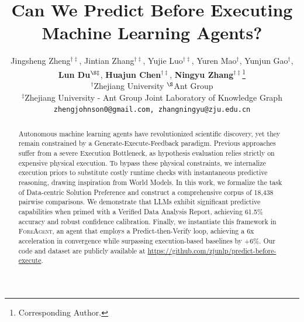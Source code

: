 \documentclass[11pt]{article}
\author{
    Jingsheng Zheng$^{\dag\ddag}$, Jintian Zhang$^{\dag\ddag}$, Yujie Luo$^{\dag\ddag}$, Yuren Mao$^{\dag}$, Yunjun Gao$^{\dag}$, \\
    \textbf{Lun Du}$^{\S\ddag}$, \textbf{Huajun Chen}$^{\dag\ddag}$, \textbf{Ningyu Zhang}$^{\dag\ddag}$\thanks{Corresponding Author.} \\
    $^{\dag}$Zhejiang University \quad $^{\S}$Ant Group \\
    $^{\ddag}$Zhejiang University - Ant Group Joint Laboratory of Knowledge Graph \\
    \texttt{zhengjohnson0@gmail.com, zhangningyu@zju.edu.cn}
}
\title{Can We Predict Before Executing Machine Learning Agents?}
\newcommand{\ours}{\textsc{ForeAgent}\xspace}
\begin{document}
\maketitle

\begin{abstract}
    Autonomous machine learning agents have revolutionized scientific discovery, yet they remain constrained by a Generate-Execute-Feedback paradigm. Previous approaches suffer from a severe Execution Bottleneck, as hypothesis evaluation relies strictly on expensive physical execution. To bypass these physical constraints, we internalize execution priors to substitute costly runtime checks with instantaneous predictive reasoning, drawing inspiration from World Models. In this work, we formalize the task of Data-centric Solution Preference and construct a comprehensive corpus of 18,438 pairwise comparisons. We demonstrate that LLMs exhibit significant predictive capabilities when primed with a Verified Data Analysis Report, achieving 61.5\% accuracy and robust confidence calibration. Finally, we instantiate this framework in \ours, an agent that employs a Predict-then-Verify loop, achieving a 6x acceleration in convergence while surpassing execution-based baselines by +6\%. Our code and dataset are publicly available at \url{https://github.com/zjunlp/predict-before-execute}.
\end{abstract}


\end{document}
